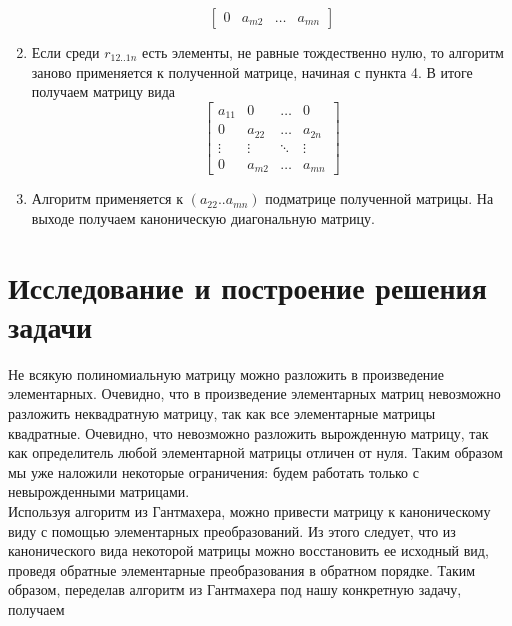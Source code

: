 \documentclass[14pt, a4paper]{extreport}
\begin{document}
\begin{enumerate}
\[\begin{bmatrix}
					0 & a_{m2} & \dots & a_{mn}
				\end{bmatrix}
			\]
		\item Если среди $r_{12..1n}$ есть элементы, не равные тождественно
			нулю, то алгоритм заново применяется к полученной матрице, начиная
			с пункта 4. В итоге получаем матрицу вида
			\[
				\begin{bmatrix}
					a_{11} & 0 & \dots & 0 \\
					0 & a_{22} & \dots & a_{2n} \\
					\vdots & \vdots & \ddots & \vdots \\
					0 & a_{m2} & \dots & a_{mn}
				\end{bmatrix}
			\]
		\item Алгоритм применяется к $(a_{22}..a_{mn})$ подматрице полученной матрицы.
			На выходе получаем каноническую диагональную матрицу.
	\end{enumerate}
	\newpage

\chapter{Исследование и построение решения задачи}
	Не всякую полиномиальную матрицу можно разложить в произведение элементарных.
	Очевидно, что в произведение элементарных матриц невозможно разложить неквадратную матрицу,
	так как все элементарные матрицы квадратные.
	Очевидно, что невозможно разложить вырожденную матрицу, так как определитель любой элементарной матрицы отличен от нуля.
	Таким образом мы уже наложили некоторые ограничения: будем работать только с невырожденными матрицами.\\
	Используя алгоритм из Гантмахера\cite{gantmaher}, можно привести матрицу к каноническому виду с
	помощью элементарных преобразований. Из этого следует, что из канонического
	вида некоторой матрицы можно восстановить ее исходный вид, проведя обратные
	элементарные преобразования в обратном порядке. Таким образом, переделав
	алгоритм из Гантмахера под нашу конкретную задачу, получаем
\end{document}
